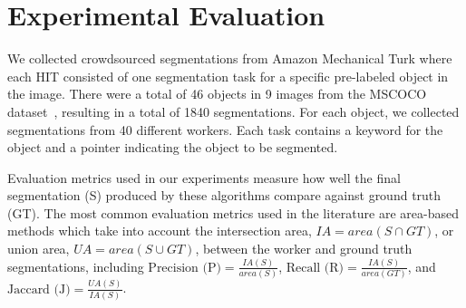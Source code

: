 \section{Experimental Evaluation\label{sec:experiment}}

\par \noindent We collected crowdsourced segmentations from Amazon Mechanical Turk where each HIT consisted of one segmentation task for a specific pre-labeled object in the image. There were a total of 46 objects in 9 images from the MSCOCO dataset~\cite{Lin2014}, resulting in a total of 1840 segmentations. For each object, we collected segmentations from 40 different workers. Each task contains a keyword for the object and a pointer indicating the object to be segmented.  %

\par \noindent Evaluation metrics used in our experiments measure how well the final segmentation (S) produced by these algorithms compare against ground truth (GT). The most common evaluation metrics used in the literature are area-based methods which take into account the intersection area, $IA=area(S\cap GT)$, or union area, $UA=area(S\cup GT)$, between the worker and ground truth segmentations, including %
    $\text{Precision (P)} = \frac{IA(S)}{area(S)}$, 
    $\text{Recall (R)} = \frac{IA(S)}{area(GT)}$, and 
    $\text{Jaccard (J)} = \frac{UA(S)}{IA(S)}$.

